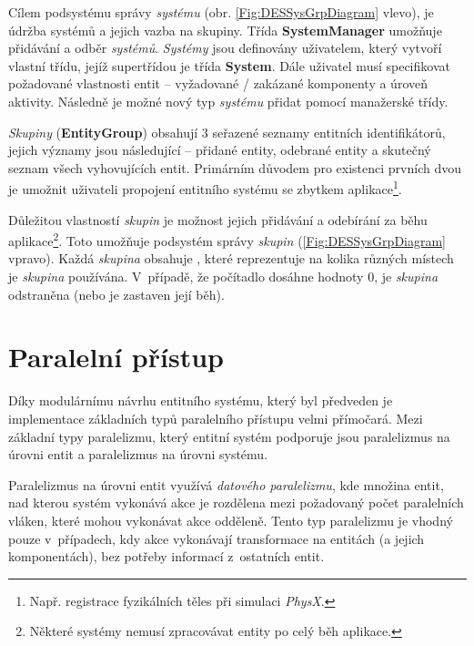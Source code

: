 Cílem podsystému správy \emph{systému} (obr. \ref{Fig:DESSysGrpDiagram} vlevo), je údržba systémů a jejich vazba na skupiny. Třída \textbf{SystemManager} umožňuje přidávání a odběr \emph{systémů}. \emph{Systémy} jsou definovány uživatelem, který vytvoří vlastní třídu, jejíž supertřídou je třída \textbf{System}. Dále uživatel musí specifikovat požadované vlastnosti entit -- vyžadované / zakázané komponenty a úroveň aktivity. Následně je možné nový typ \emph{systému} přidat pomocí manažerské třídy.

\emph{Skupiny} (\textbf{EntityGroup}) obsahují 3 seřazené seznamy entitních identifikátorů, jejich významy jsou následující -- přidané entity, odebrané entity a skutečný seznam všech vyhovujících entit. Primárním důvodem pro existenci prvních dvou je umožnit uživateli propojení entitního systému se zbytkem aplikace\footnote{Např. registrace fyzikálních těles při simulaci \emph{PhysX}.}.

Důležitou vlastností \emph{skupin} je možnost jejich přidávání a odebírání za běhu aplikace\footnote{Některé systémy nemusí zpracovávat entity po celý běh aplikace.}. Toto umožňuje podsystém správy \emph{skupin} (\ref{Fig:DESSysGrpDiagram} vpravo). Každá \emph{skupina} obsahuje , které reprezentuje na kolika různých místech je \emph{skupina} používána. V~případě, že počítadlo dosáhne hodnoty 0, je \emph{skupina} odstraněna (nebo je zastaven její běh). 

\section{Paralelní přístup}

Díky modulárnímu návrhu entitního systému, který byl předveden je implementace základních typů paralelního přístupu velmi přímočará. Mezi základní typy paralelizmu, který entitní systém podporuje jsou paralelizmus na úrovni entit a paralelizmus na úrovni systému.

Paralelizmus na úrovni entit využívá \emph{datového paralelizmu}, kde množina entit, nad kterou systém vykonává akce je rozdělena mezi požadovaný počet paralelních vláken, které mohou vykonávat akce odděleně. Tento typ paralelizmu je vhodný pouze v~případech, kdy akce vykonávají transformace na entitách (a jejich komponentách), bez potřeby informací z~ostatních entit. 

